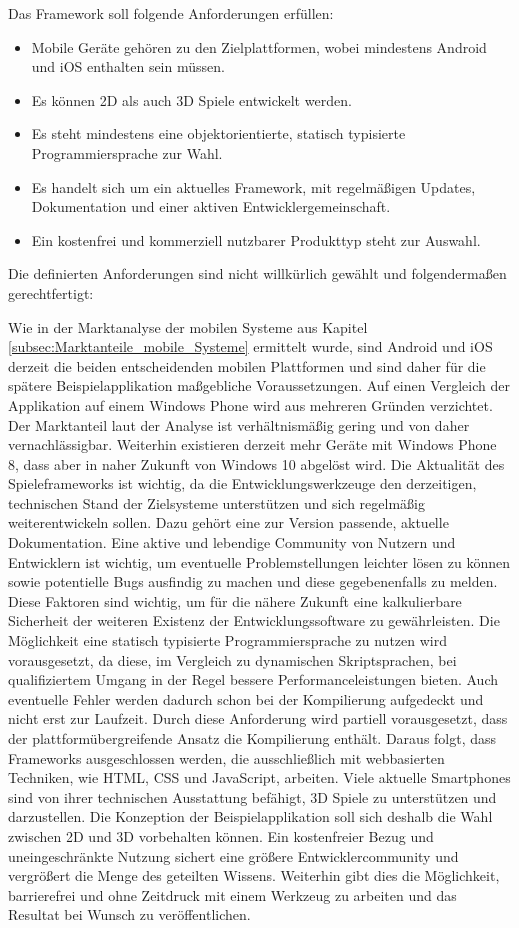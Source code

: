 \bigskip
Das Framework soll folgende Anforderungen erfüllen:
\begin{itemize}
	\item Mobile Geräte gehören zu den Zielplattformen, wobei mindestens Android und iOS enthalten sein müssen.
	\item Es können 2D als auch 3D Spiele entwickelt werden.
	\item Es steht mindestens eine objektorientierte, statisch typisierte Programmiersprache zur Wahl.
	\item Es handelt sich um ein aktuelles Framework, mit regelmäßigen Updates, Dokumentation und einer aktiven Entwicklergemeinschaft.
	\item Ein kostenfrei und kommerziell nutzbarer Produkttyp steht zur Auswahl.
\end{itemize}


Die definierten Anforderungen sind nicht willkürlich gewählt und folgendermaßen gerechtfertigt:

\bigskip
Wie in der Marktanalyse der mobilen Systeme aus Kapitel \ref{subsec:Marktanteile_mobile_Systeme} ermittelt wurde, sind Android und iOS derzeit die beiden entscheidenden mobilen Plattformen und sind daher für die spätere Beispielapplikation maßgebliche Voraussetzungen. 
Auf einen Vergleich der Applikation auf einem Windows Phone wird aus mehreren Gründen verzichtet. Der Marktanteil laut der Analyse ist verhältnismäßig gering und von daher vernachlässigbar. Weiterhin existieren derzeit mehr Geräte mit Windows Phone 8, dass aber in naher Zukunft von Windows 10 abgelöst wird.
Die Aktualität des Spieleframeworks ist wichtig, da die Entwicklungswerkzeuge den derzeitigen, technischen Stand der Zielsysteme unterstützen und sich regelmäßig weiterentwickeln sollen. Dazu gehört eine zur Version passende, aktuelle Dokumentation. Eine aktive und lebendige Community von Nutzern und Entwicklern ist wichtig, um eventuelle Problemstellungen leichter lösen zu können sowie potentielle Bugs ausfindig zu machen und diese gegebenenfalls zu melden. Diese Faktoren sind wichtig, um für die nähere Zukunft eine kalkulierbare Sicherheit der weiteren Existenz der Entwicklungssoftware zu gewährleisten. Die Möglichkeit eine statisch typisierte Programmiersprache zu nutzen wird vorausgesetzt, da diese, im Vergleich zu dynamischen Skriptsprachen, bei qualifiziertem Umgang in der Regel bessere Performanceleistungen bieten. Auch eventuelle Fehler werden dadurch schon bei der Kompilierung aufgedeckt und nicht erst zur Laufzeit. Durch diese Anforderung wird partiell vorausgesetzt, dass der plattformübergreifende Ansatz die Kompilierung enthält. Daraus folgt, dass Frameworks ausgeschlossen werden, die ausschließlich mit webbasierten Techniken, wie HTML, CSS und JavaScript, arbeiten. Viele aktuelle Smartphones sind von ihrer technischen Ausstattung befähigt, 3D Spiele zu unterstützen und darzustellen. Die Konzeption der Beispielapplikation soll sich deshalb die Wahl zwischen 2D und 3D vorbehalten können. Ein kostenfreier Bezug und uneingeschränkte Nutzung sichert eine größere Entwicklercommunity und vergrößert die Menge des geteilten Wissens. Weiterhin gibt dies die Möglichkeit, barrierefrei und ohne Zeitdruck mit einem Werkzeug zu arbeiten und das Resultat bei Wunsch zu veröffentlichen.

